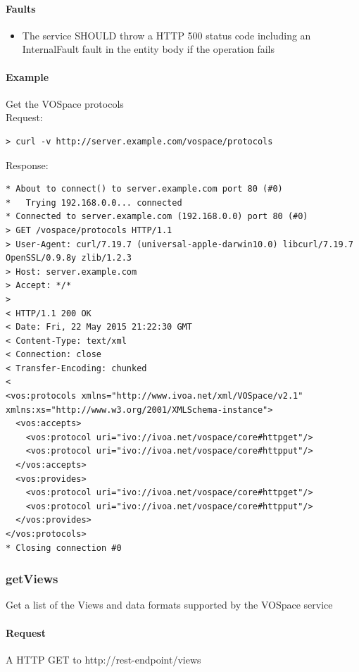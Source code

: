 \documentclass[11pt,a4paper]{ivoa}
\begin{document}
\paragraph{Faults}
\begin{itemize}
    \item The service SHOULD throw a HTTP 500 status code including an InternalFault fault in the entity body if the operation fails
\end{itemize}

\paragraph{Example}
Get the VOSpace protocols
\\[5px]
\noindent
Request:
\begin{lstlisting}
> curl -v http://server.example.com/vospace/protocols
\end{lstlisting}
Response:
\begin{lstlisting}
* About to connect() to server.example.com port 80 (#0)
*   Trying 192.168.0.0... connected
* Connected to server.example.com (192.168.0.0) port 80 (#0)
> GET /vospace/protocols HTTP/1.1
> User-Agent: curl/7.19.7 (universal-apple-darwin10.0) libcurl/7.19.7 OpenSSL/0.9.8y zlib/1.2.3
> Host: server.example.com
> Accept: */*
>
< HTTP/1.1 200 OK
< Date: Fri, 22 May 2015 21:22:30 GMT
< Content-Type: text/xml
< Connection: close
< Transfer-Encoding: chunked
<
<vos:protocols xmlns="http://www.ivoa.net/xml/VOSpace/v2.1" xmlns:xs="http://www.w3.org/2001/XMLSchema-instance">
  <vos:accepts>
    <vos:protocol uri="ivo://ivoa.net/vospace/core#httpget"/>
    <vos:protocol uri="ivo://ivoa.net/vospace/core#httpput"/>
  </vos:accepts>
  <vos:provides>
    <vos:protocol uri="ivo://ivoa.net/vospace/core#httpget"/>
    <vos:protocol uri="ivo://ivoa.net/vospace/core#httpput"/>
  </vos:provides>
</vos:protocols>
* Closing connection #0
\end{lstlisting}

\subsubsection{getViews}
\label{subsubsec:getviews}
Get a list of the Views and data formats supported by the VOSpace service

\paragraph{Request}
A HTTP GET to http://rest-endpoint/views
\end{document}
